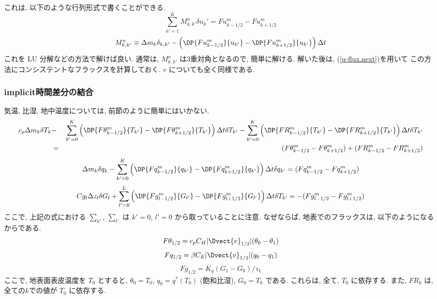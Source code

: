 これは, 以下のような行列形式で書くことができる.
%
\begin{equation}
  \sum_{k'=1}^{K} M^u_{k,k'} \delta u_k' = Fu^{m}_{k-1/2} - Fu^{m}_{k+1/2}
\end{equation}
%
\begin{equation}
M^u_{k,k'} \equiv \Delta m_k \delta_{k,k'}
          -  \left(  \DP{Fu^{m}_{k-1/2}}{u_{k'}} 
                   - \DP{Fu^{m}_{k+1/2}}{u_{k'}} \right) \Delta t
   \label{u-matrix}
\end{equation}
%
これを LU 分解などの方法で解けば良い.
通常は, $M^u_{k,k'}$ は3重対角となるので, 簡単に解ける.
解いた後は, (\ref{u-flux.next})を用いて
この方法にコンシステントなフラックスを計算しておく.
$v$ についても全く同様である.

\subsubsection{implicit時間差分の結合}

気温, 比湿, 地中温度については, 前節のように簡単にはいかない.
%
\begin{eqnarray}
  c_p \Delta m_k \delta T_k
  & - & \sum_{k'=0}^{K}
                 \left(  \DP{F\theta^{m}_{k-1/2}}{T_{k'}} 
                       - \DP{F\theta^{m}_{k+1/2}}{T_{k'}} \right)
                 \Delta t\delta T_{k'}
  - \sum_{k'=0}^{K}
                 \left(  \DP{FR^{m}_{k-1/2}}{T_{k'}} 
                       - \DP{FR^{m}_{k+1/2}}{T_{k'}} \right)
                 \Delta t\delta T_{k'} \nonumber \\
 & = &  ( F\theta^{m}_{k-1/2} - F\theta^{m}_{k+1/2} )
  + ( FR^{m}_{k-1/2} - FR^{m}_{k+1/2} )
\label{deq-theta}
\end{eqnarray}
%
\begin{equation}
  \Delta m_k \delta q_k
  -  \sum_{k'=0}^{K} \left(  \DP{Fq^{m}_{k-1/2}}{q_{k'}} 
                            - \DP{Fq^{m}_{k+1/2}}{q_{k'}} \right)
                 \Delta t\delta q_{k'}
  = ( Fq^{m}_{k-1/2} - Fq^{m}_{k+1/2} )
\label{deq-q}
\end{equation}
%
\begin{equation}
  Cg_l \Delta z_l \delta G_l
  +  \sum_{l'=0}^{L} \left(  \DP{Fg^{m}_{l-1/2}}{G_{l'}} 
                            - \DP{Fg^{m}_{l+1/2}}{G_{l'}} \right)
                 \Delta t\delta T_{k'}
  = - ( Fg^{m}_{l-1/2} - Fg^{m}_{l+1/2} )
\label{deq-g}
\end{equation}
%
ここで, 上記の式における $\sum_{k'}$, $\sum_{l'}$ は
$k'=0$, $l'=0$ から取っていることに注意. なぜならば,
地表でのフラックスは, 以下のようになるからである.
\begin{equation}
  F\theta_{1/2} =  c_p C_H |\Dvect{v}_{1/2}| (\theta_0 - \theta_1)
\end{equation}
\begin{equation}
  Fq_{1/2} =  \beta C_E |\Dvect{v}_{1/2}| (q_0 - q_1)
\end{equation}
\begin{equation}
  Fg_{1/2} =  K_g (G_1 - G_0)/z_1
\end{equation}
ここで, 地表面表皮温度を $T_0$ とすると,
$\theta_0 = T_0$, $q_0 = q^*(T_0)$ (飽和比湿), $G_0 = T_0$ である.
これらは, 全て, $T_0$ に依存する.
また, $FR_{k}$ は, 全ての$k$での値が $T_0$ に依存する. 

